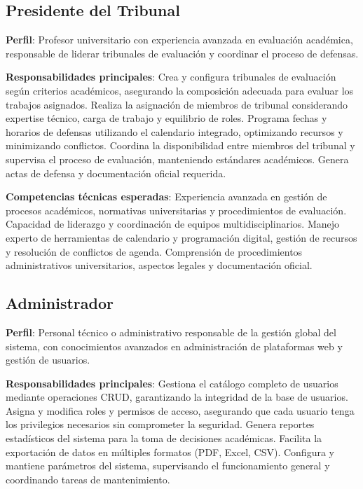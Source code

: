 \documentclass[12pt,a4paper,oneside]{report}
\begin{document}
\subsection{Presidente del Tribunal}\label{presidente-del-tribunal}

\textbf{Perfil}: Profesor universitario con experiencia avanzada en
evaluación académica, responsable de liderar tribunales de evaluación y
coordinar el proceso de defensas.

\textbf{Responsabilidades principales}: Crea y configura tribunales de evaluación según criterios académicos, asegurando la composición adecuada para evaluar los trabajos asignados. Realiza la asignación de miembros de tribunal considerando expertise técnico, carga de trabajo y equilibrio de roles. Programa fechas y horarios de defensas utilizando el calendario integrado, optimizando recursos y minimizando conflictos. Coordina la disponibilidad entre miembros del tribunal y supervisa el proceso de evaluación, manteniendo estándares académicos. Genera actas de defensa y documentación oficial requerida.

\textbf{Competencias técnicas esperadas}: Experiencia avanzada en gestión de procesos académicos, normativas universitarias y procedimientos de evaluación. Capacidad de liderazgo y coordinación de equipos multidisciplinarios. Manejo experto de herramientas de calendario y programación digital, gestión de recursos y resolución de conflictos de agenda. Comprensión de procedimientos administrativos universitarios, aspectos legales y documentación oficial.

\subsection{Administrador}\label{administrador}

\textbf{Perfil}: Personal técnico o administrativo responsable de la
gestión global del sistema, con conocimientos avanzados en
administración de plataformas web y gestión de usuarios.

\textbf{Responsabilidades principales}: Gestiona el catálogo completo de usuarios mediante operaciones CRUD, garantizando la integridad de la base de usuarios. Asigna y modifica roles y permisos de acceso, asegurando que cada usuario tenga los privilegios necesarios sin comprometer la seguridad. Genera reportes estadísticos del sistema para la toma de decisiones académicas. Facilita la exportación de datos en múltiples formatos (PDF, Excel, CSV). Configura y mantiene parámetros del sistema, supervisando el funcionamiento general y coordinando tareas de mantenimiento.
\end{document}
